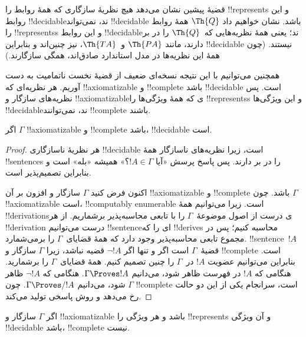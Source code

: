 \documentclass[../../../include/open-logic-section]{subfiles}
\begin{document}
\begin{explain}
قضیهٔ پیشین نشان می‌دهد هیچ نظریهٔ سازگاری که همهٔ روابط را
!!{represents} و این روابط !!{decidable}ند، نمی‌تواند !!{decidable} باشد.
نشان خواهیم داد $\Th{Q}$ همهٔ روابط را !!{represents}s و این روابط !!{decidable}ند؛ یعنی همهٔ نظریه‌هایی که~$\Th{Q}$ را در بر دارند، مانند
$\Th{PA}$ و~$\Th{TA}$، نیز چنین‌اند و بنابراین !!{decidable}
نیستند. (چون همهٔ این نظریه‌ها در مدل استاندارد صادق‌اند، همگی
سازگارند.)

همچنین می‌توانیم با این نتیجه نسخه‌ای ضعیف از قضیهٔ نخست ناتمامیت به
دست آوریم. هر نظریه‌ای که !!{axiomatizable} و !!{complete} باشد
!!{decidable} است. پس نظریه‌های سازگار و !!{axiomatizable}ی که همهٔ
ویژگی‌ها را !!{represents}s و این ویژگی‌ها !!{decidable}ند، نمی‌توانند !!{complete}
باشند.
\end{explain}

\begin{thm}
اگر $\Gamma$ !!{axiomatizable} و !!{complete} باشد، !!{decidable} است.
\end{thm}

\begin{proof}
هر نظریهٔ ناسازگاری !!{decidable} است، زیرا نظریه‌های ناسازگار همهٔ
!!{sentence}s را در بر دارند. پس پاسخ پرسش «آیا $!A\in\Gamma$؟» همیشه
«بله» است و بنابراین تصمیم‌پذیر است.

اکنون فرض کنید $\Gamma$ سازگار و افزون بر آن !!{axiomatizable} و
!!{complete} باشد. چون $\Gamma$ !!{axiomatizable} است،
!!{computably enumerable} است. زیرا می‌توانیم همهٔ !!{derivation}sی درست
از اصول موضوعهٔ~$\Gamma$ را با تابعی محاسبه‌پذیر برشماریم. از هر
!!{derivation} درست می‌توانیم !!{sentence}ای را که !!{derive}s محاسبه کنیم؛
پس در مجموع تابعی محاسبه‌پذیر وجود دارد که همهٔ قضایای~$\Gamma$ را
برمی‌شمارد. !!{sentence}~$!A$ قضیهٔ~$\Gamma$ است اگر و تنها اگر
$\lnot !A$ قضیه نباشد، زیرا $\Gamma$ سازگار و !!{complete} است. بنابراین می‌توانیم عضویت
$!A$ در~$\Gamma$ را چنین تصمیم کنیم. همهٔ قضایای~$\Gamma$ را
برشمارید. هنگامی که $!A$ در فهرست ظاهر شود، می‌دانیم
$\Gamma\Proves !A$. هنگامی که $\lnot !A$ ظاهر شود، می‌دانیم
$\Gamma\Proves/ !A$. چون $\Gamma$ !!{complete} است، سرانجام یکی از این
دو حالت رخ می‌دهد و روش پاسخی تولید می‌کند.
\end{proof}

\begin{cor}
اگر $\Gamma$ سازگار و !!{axiomatizable} باشد و هر ویژگی را
!!{represents} و آن ویژگی !!{decidable} باشد، !!{complete} نیست.
\end{cor}
\end{document}
